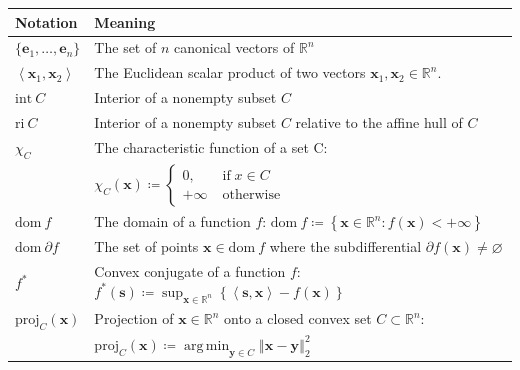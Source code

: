 \documentclass[11pt]{article}
\numberwithin{prop}{section}
\numberwithin{lem}{section}
\numberwithin{rem}{section}
\numberwithin{cor}{section}
\numberwithin{thm}{section}
\numberwithin{defn}{section}
\numberwithin{fact}{section}
\theoremstyle{plain}
\def\bs {\boldsymbol{s}}
\def\bx {\boldsymbol{x}}
\def\by {\boldsymbol{y}}
\def\R {\mathbb{R}}
\def\cone{\mathrm{cone}}
\def\dom {\mathrm{dom~}}    %
\def\interior {\mathrm{int }}  %
\def\ri {\mathrm{ri}}      %
\def\proj {\mathrm{proj}}
\def\Rn {\R^n}
\DeclareMathOperator*{\argmin}{arg\,min}
\begin{document}
\begin{table}[ht]
    \centering
    \begin{tabular}{l|l}
    \hline
        Notation & Meaning \\
        \hline
        $\{\boldsymbol{e}_{1},\dots,\boldsymbol{e}_{n}\}$ & The set of $n$ canonical vectors of $\Rn$\\
        $\left\langle \bx_{1},\bx_{2} \right\rangle$ & The Euclidean scalar product of two vectors $\bx_{1},\bx_{2} \in \Rn$.\\ 
        $\interior{~C}$ & Interior of a nonempty subset $C$  \\
        $\ri~C$ & Interior of a nonempty subset $C$ relative to the affine hull of $C$ \\
        $\chi_{C}$ & The characteristic function of a set C: \\
        & \quad $\chi_{C}(\bx) \coloneqq \begin{cases} 0, \; &\text{if}\;x \in C \\ +\infty \; &\text{otherwise}\end{cases}$ \\
        $\dom f$ & The domain of a function $f$: $\dom f \coloneqq \left\{ \bx \in \Rn : f(\bx) < +\infty\right\}$ \\
        $\dom \partial f$ & The set of points $\bx \in \dom f$ where the subdifferential $\partial f(\bx) \neq \varnothing$\\
        $f^{*}$& Convex conjugate of a function $f$: $f^{*}(\bs)\coloneqq\sup_{\bx \in \Rn}\left\{\left\langle \bs,\bx\right\rangle -f(\bx)\right\}$ \\
        $\proj_{C}(\bx)$ & Projection of $\bx \in \Rn$ onto a closed convex set $C \subset \Rn$: \\
        & \quad $\proj_{C}(\bx) \coloneqq \argmin_{\by\in C}\left\Vert \bx-\by\right\Vert _{2}^{2}$ \\
        \hline
    \end{tabular}    \label{tab:notation}
\end{table}
\end{document}
